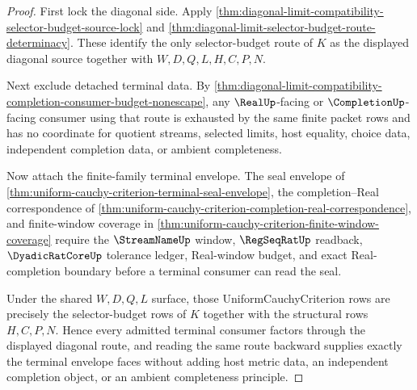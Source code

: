 \begin{proof}
First lock the diagonal side. Apply \autoref{thm:diagonal-limit-compatibility-selector-budget-source-lock} and \autoref{thm:diagonal-limit-selector-budget-route-determinacy}. These identify the only selector-budget route of $K$ as the displayed diagonal source together with $W,D,Q,L,H,C,P,N$.

Next exclude detached terminal data. By \autoref{thm:diagonal-limit-compatibility-completion-consumer-budget-nonescape}, any $\RealUp$-facing or $\CompletionUp$-facing consumer using that route is exhausted by the same finite packet rows and has no coordinate for quotient streams, selected limits, host equality, choice data, independent completion data, or ambient completeness.

Now attach the finite-family terminal envelope. The seal envelope of \autoref{thm:uniform-cauchy-criterion-terminal-seal-envelope}, the completion--Real correspondence of \autoref{thm:uniform-cauchy-criterion-completion-real-correspondence}, and finite-window coverage in \autoref{thm:uniform-cauchy-criterion-finite-window-coverage} require the $\StreamNameUp$ window, $\RegSeqRatUp$ readback, $\DyadicRatCoreUp$ tolerance ledger, Real-window budget, and exact Real-completion boundary before a terminal consumer can read the seal.

Under the shared $W,D,Q,L$ surface, those UniformCauchyCriterion rows are precisely the selector-budget rows of $K$ together with the structural rows $H,C,P,N$. Hence every admitted terminal consumer factors through the displayed diagonal route, and reading the same route backward supplies exactly the terminal envelope faces without adding host metric data, an independent completion object, or an ambient completeness principle.
\end{proof}

